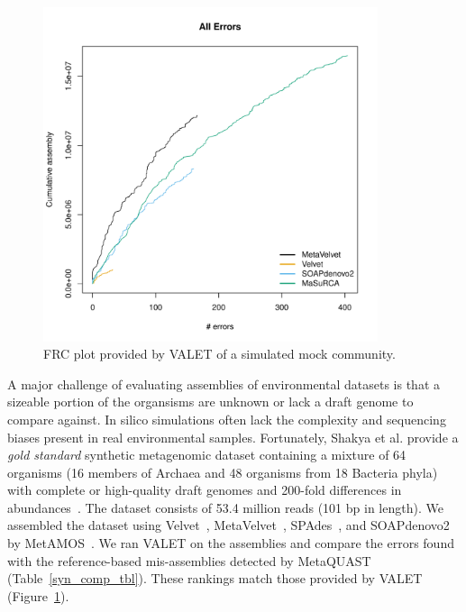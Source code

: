 \documentclass{article}
\begin{document}
\begin{figure}
\includegraphics[width=3.86in]{figures/simulated_frc}
\caption[FRC plot of a simulated mock community]{FRC plot provided by VALET of a simulated mock community.}
\label{fig:simulated_frc}
\end{figure}

A major challenge of evaluating assemblies of environmental datasets is that a sizeable portion of the organsisms are unknown or lack a draft genome to compare against.
In silico simulations often lack the complexity and sequencing biases present in real environmental samples.
Fortunately, Shakya et al. provide a \emph{gold standard} synthetic metagenomic dataset containing a mixture of 64 organisms (16 members of Archaea and 48 organisms from 18 Bacteria phyla) with complete or high-quality draft genomes and 200-fold differences in abundances~\citep{shakya2013comparative}.
The dataset consists of 53.4 million reads (101 bp in length).
We assembled the dataset using Velvet~\citep{zerbino2008velvet}, MetaVelvet~\citep{namiki2012metavelvet}, SPAdes~\citep{bankevich2012spades}, and SOAPdenovo2~\citep{luo2012soapdenovo2} by MetAMOS~\citep{treangen2013metamos}.
We ran VALET on the assemblies and compare the errors found with the reference-based mis-assemblies detected by MetaQUAST (Table~\ref{syn_comp_tbl}). 
These rankings match those provided by VALET (Figure~\ref{fig:simulated_frc}).
\end{document}

